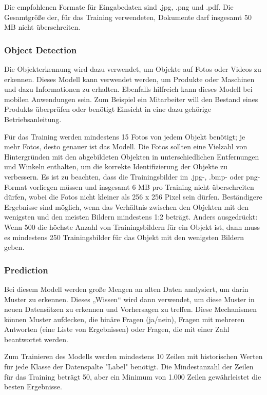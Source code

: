 Die empfohlenen Formate für Eingabedaten sind .jpg, .png und .pdf. Die Gesamtgröße der, für das Training verwendeten, Dokumente darf insgesamt 50 MB nicht überschreiten.

\subsubsection{Object Detection}

Die Objekterkennung wird dazu verwendet, um Objekte auf Fotos oder Videos zu erkennen. Dieses Modell kann verwendet werden, um Produkte oder Maschinen und dazu Informationen zu erhalten. Ebenfalls hilfreich kann dieses Modell bei mobilen Anwendungen sein. Zum Beispiel ein Mitarbeiter will den Bestand eines Produkts überprüfen oder benötigt Einsicht in eine dazu gehörige Betriebsanleitung.

Für das Training werden mindestens 15 Fotos von jedem Objekt benötigt; je mehr Fotos, desto genauer ist das Modell. Die Fotos sollten eine Vielzahl von Hintergründen mit den abgebildeten Objekten in unterschiedlichen Entfernungen und Winkeln enthalten, um die korrekte Identifizierung der Objekte zu verbessern. Es ist zu beachten, dass die Trainingsbilder im .jpg-, .bmp- oder png-Format vorliegen müssen und insgesamt 6 MB pro Training nicht überschreiten dürfen, wobei die Fotos nicht kleiner als 256 x 256 Pixel sein dürfen. Beständigere Ergebnisse sind möglich, wenn das Verhältnis zwischen den Objekten mit den wenigsten und den meisten Bildern mindestens 1:2 beträgt. Anders ausgedrückt: Wenn 500 die höchste Anzahl von Trainingsbildern für ein Objekt ist, dann muss es mindestens 250 Trainingsbilder für das Objekt mit den wenigsten Bildern geben.

\subsubsection{Prediction}

Bei diesem Modell werden große Mengen an alten Daten analysiert, um darin Muster zu erkennen. Dieses „Wissen“ wird dann verwendet, um diese Muster in neuen Datensätzen zu erkennen und Vorhersagen zu treffen. Diese Mechanismen können Muster aufdecken, die binäre Fragen (ja/nein), Fragen mit mehreren Antworten (eine Liste von Ergebnissen) oder Fragen, die mit einer Zahl beantwortet werden.

Zum Trainieren des Modells werden mindestens 10 Zeilen mit historischen Werten für jede Klasse der Datenspalte "Label" benötigt. Die Mindestanzahl der Zeilen für das Training beträgt 50, aber ein Minimum von 1.000 Zeilen gewährleistet die besten Ergebnisse.

